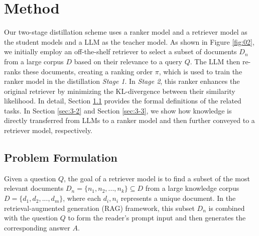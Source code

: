 \section{Method}




Our two-stage distillation scheme uses a ranker model and a retriever model as the student models and a LLM as the teacher model.
As shown in Figure \ref{fig:02}, we initially employ an off-the-shelf retriever to select a subset of documents $D_n$ from a large corpus $D$ based on their relevance to a query $Q$.
The LLM then re-ranks these documents, creating a ranking order $\pi$, which is used to train the ranker model in the distillation \textit{Stage 1}.
In \textit{Stage 2}, this ranker enhances the original retriever by minimizing the KL-divergence between their similarity likelihood.
In detail, Section \ref{sec:3-1} provides the formal definitions of the related tasks. 
In Section \ref{sec:3-2} and Section \ref{sec:3-3}, we show how knowledge is directly transferred from LLMs to a ranker model and then further conveyed to a retriever model, respectively.


\subsection{Problem Formulation}
\label{sec:3-1}
Given a question $Q$, the goal of a retriever model is to find a subset of the most relevant documents $D_n=\{n_1, n_2, ..., n_k\} \subseteq D$ from a large knowledge corpus $D=\{d_1, d_2, ..., d_m\}$, where each $d_i, n_i$ represents a unique document.
In the retrieval-augmented generation (RAG) framework, this subset $D_n$ is combined with the question $Q$ to form the reader's prompt input and then generates the corresponding answer $A$.

